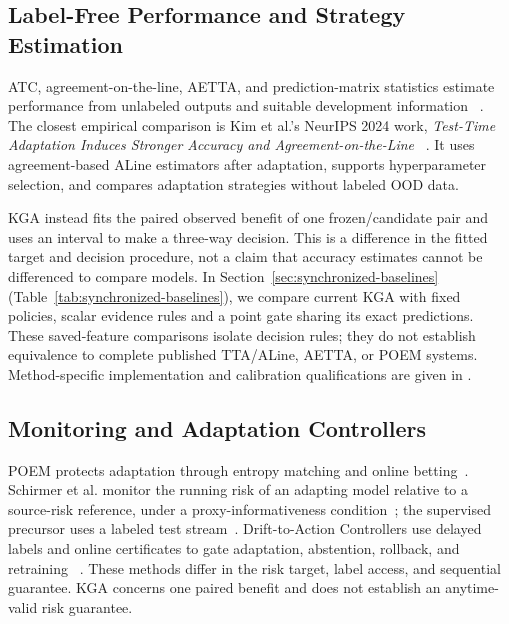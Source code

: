 \subsection{Label-Free Performance and Strategy Estimation}

ATC, agreement-on-the-line, AETTA, and prediction-matrix statistics estimate performance from
unlabeled outputs and suitable development information
~\cite{garg2022atc,baek2022aol,miller2021aol,lee2024aetta,deng2023confidence,xie2024mano}.
The closest empirical comparison is Kim et al.'s NeurIPS 2024 work,
\emph{Test-Time Adaptation Induces Stronger Accuracy and Agreement-on-the-Line}
~\cite{kim2024ttaline}. It uses agreement-based ALine estimators after adaptation, supports
hyperparameter selection, and compares adaptation strategies without labeled OOD data.

KGA instead fits the paired observed benefit of one frozen/candidate pair and uses an interval
to make a three-way decision. This is a difference in the fitted target and decision procedure,
not a claim that accuracy estimates cannot be differenced to compare models. In Section~\ref{sec:synchronized-baselines}
(Table~\ref{tab:synchronized-baselines}), we compare current KGA with fixed
policies, scalar evidence rules and a point gate sharing its exact predictions.
These saved-feature comparisons isolate decision rules; they do not establish equivalence to
complete published TTA/ALine, AETTA, or POEM systems. Method-specific implementation and
calibration qualifications are given in .

\subsection{Monitoring and Adaptation Controllers}

POEM protects adaptation through entropy matching and online betting~\cite{bar2024poem}.
Schirmer et al. monitor the running risk of an adapting model relative to a source-risk reference,
under a proxy-informativeness condition~\cite{schirmer2025monitoring}; the supervised precursor
uses a labeled test stream~\cite{podkopaev2022tracking}. Drift-to-Action Controllers use delayed
labels and online certificates to gate adaptation, abstention, rollback, and retraining
~\cite{lamaakal2026drifttoaction}. These methods differ in the risk target, label access, and
sequential guarantee. KGA concerns one paired benefit and does not establish an anytime-valid
risk guarantee.

